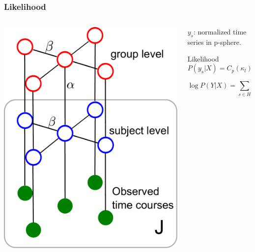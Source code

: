 \documentclass[serif]{beamer}
\begin{document}
\begin{frame}
  \frametitle{Likelihood}
  \begin{columns}[c]
    \begin{column}{3cm}
      \includegraphics[width=\textwidth]{figure1/grp2}
    \end{column}

    \begin{column}{7cm}
      \begin{block}{}
        $y_s$: normalized time series in p-sphere.
      \end{block}

      \begin{block}{Likelihood}
        \begin{equation*}
          P(y_s | X) = C_p(\kappa_l) \exp (\kappa_l \mu_l^{\top} y_s), y_s \in S^{p-1}.
        \end{equation*}

        \begin{equation*}
          \log P(Y|X) = \sum_{s\in H} \log p(y_s | x_s)
        \end{equation*}
      \end{block}
    \end{column}
  \end{columns}

\end{frame}
\end{document}
